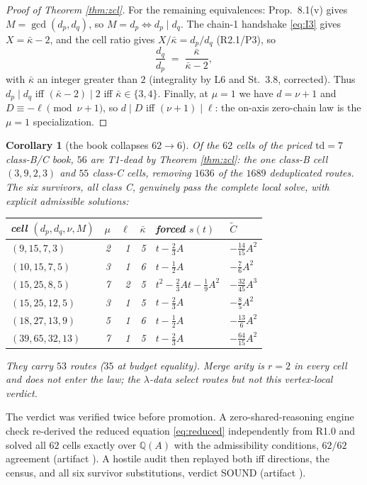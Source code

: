 \documentclass[11pt]{article}
\newtheorem{corollary}[theorem]{Corollary}
\theoremstyle{definition}
\theoremstyle{remark}
\newcommand{\kb}{\bar\kappa}
\begin{document}
\begin{proof}[Proof of Theorem \ref{thm:zcl}]
For the remaining equivalences: Prop.~8.1(v) gives $M=\gcd(d_p,d_q)$, so $M=d_p\iff d_p\mid d_q$. The chain-1 handshake \eqref{eq:I3} gives $X=\kb-2$, and the cell ratio gives $X/\kb=d_p/d_q$ (R2.1/P3), so
\begin{equation}\label{eq:kbratio}
\frac{d_q}{d_p}\;=\;\frac{\kb}{\kb-2},
\end{equation}
with $\kb$ an integer greater than $2$ (integrality by L6 and St.~3.8, corrected). Thus $d_p\mid d_q$ iff $(\kb-2)\mid 2$ iff $\kb\in\{3,4\}$. Finally, at $\mu=1$ we have $d=\nu+1$ and $D\equiv-\ell\pmod{\nu+1}$, so $d\mid D$ iff $(\nu+1)\mid\ell$: the on-axis zero-chain law is the $\mu=1$ specialization.
\end{proof}

\begin{corollary}[the book collapses $62\to6$]\label{cor:62to6}
Of the $62$ cells of the priced $\mathrm{td}=7$ class-B/C book, $56$ are T1-dead by Theorem \ref{thm:zcl}: the one class-B cell $(3,9,2,3)$ and $55$ class-C cells, removing $1636$ of the $1689$ deduplicated routes. The six survivors, all class C, genuinely pass the complete local solve, with explicit admissible solutions:
\begin{center}
\small
\begin{tabular}{lrrrll}
\toprule
cell $(d_p,d_q,\nu,M)$ & $\mu$ & $\ell$ & $\kb$ & forced $s(t)$ & $\widetilde C$\\
\midrule
$(9,15,7,3)$ & 2 & 1 & 5 & $t-\frac23A$ & $-\frac{14}{15}A^2$\\
$(10,15,7,5)$ & 3 & 1 & 6 & $t-\frac12A$ & $-\frac76A^2$\\
$(15,25,8,5)$ & 7 & 2 & 5 & $t^2-\frac23At-\frac19A^2$ & $-\frac{32}{45}A^3$\\
$(15,25,12,5)$ & 3 & 1 & 5 & $t-\frac23A$ & $-\frac85A^2$\\
$(18,27,13,9)$ & 5 & 1 & 6 & $t-\frac12A$ & $-\frac{13}{6}A^2$\\
$(39,65,32,13)$ & 7 & 1 & 5 & $t-\frac23A$ & $-\frac{64}{15}A^2$\\
\bottomrule
\end{tabular}
\end{center}
They carry $53$ routes ($35$ at budget equality). Merge arity is $r=2$ in every cell and does not enter the law; the $\lambda$-data select routes but not this vertex-local verdict.
\end{corollary}

The verdict was verified twice before promotion. A zero-shared-reasoning engine check re-derived the reduced equation \eqref{eq:reduced} independently from R1.0 and solved all $62$ cells exactly over $\mathbb{Q}(A)$ with the admissibility conditions, $62/62$ agreement (artifact ). A hostile audit then replayed both iff directions, the census, and all six survivor substitutions, verdict SOUND (artifact ).
\end{document}
